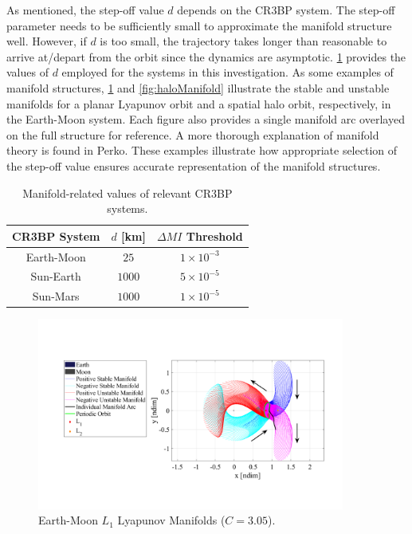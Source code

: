 As mentioned, the step-off value $d$ depends on the CR3BP system. The step-off parameter needs to
be sufficiently small to approximate the manifold structure well. However, if $d$ is too small, the
trajectory takes longer than reasonable to arrive at/depart from the orbit since the dynamics
are asymptotic\cite{Kakoi:2015}. \cref{tab:manifoldValues} provides the values of $d$ employed for
the systems in this investigation. As some examples of manifold structures,
\cref{fig:LyapunovManifold} and \cref{fig:haloManifold} illustrate the stable and unstable
manifolds for a planar Lyapunov orbit and a spatial halo orbit, respectively, in the Earth-Moon
system. Each figure also provides a single manifold arc overlayed on the full structure for
reference. A more thorough explanation of manifold theory is found in Perko\cite{Perko:1991}. These
examples illustrate how appropriate selection of the step-off value ensures accurate representation
of the manifold structures.

\begin{table}[H]
    \centering
    \caption{Manifold-related values of relevant CR3BP systems.}
    \begin{tabular}{|c|c|c|}
        \hline
        \textbf{CR3BP System}   &   \boldmath$d$ \textbf{[km]}  &   \boldmath$\Delta MI$ \textbf{Threshold} \\  \hline
        Earth-Moon              &   $25$                        &   $1\times10^{-3}$                        \\  \hline
        Sun-Earth               &   $1000$                      &   $5\times10^{-5}$                        \\  \hline
        Sun-Mars                &   $1000$                      &   $1\times10^{-5}$                        \\  \hline
    \end{tabular}
    \label{tab:manifoldValues}
\end{table}

\begin{figure}[H]
    \centering
    \includegraphics[width=0.9\textwidth]{figures/LyapunovManifold.pdf}
    \caption{Earth-Moon $L_{1}$ Lyapunov Manifolds ($C=3.05$).}
    \label{fig:LyapunovManifold}
\end{figure}

